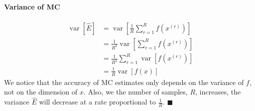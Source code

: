 \documentclass[11pt]{article}
\newcommand{\qed}{\hfill $\blacksquare$}
\begin{document}
\paragraph{Variance of MC}
\begin{align*}
    \operatorname{var}[\hat{E}]
    &=\operatorname{var}\left[\frac{1}{R} \sum_{r=1}^{R} f\left(x^{(r)}\right)\right] \\
    &= \frac{1}{R^{2}} \operatorname{var}\left[\sum_{r=1}^{R} f\left(x^{(r)}\right)\right] \\
    &= \frac{1}{R^{2}} \sum_{r=1}^{R} \operatorname{var}\left[f\left(x^{(r)}\right)\right]\\
    &= \frac{1}{R}\operatorname{var}\left[f(x) \right]
\end{align*}
We notice that the accuracy of MC estimates only depends on the variance of $f$, not on the dimension of $x$. Also, we the number of samples, $R$, increases, the variance $\hat{E}$ will decrease at a rate proportional to $\frac{1}{R}$.
\qed
\end{document}
